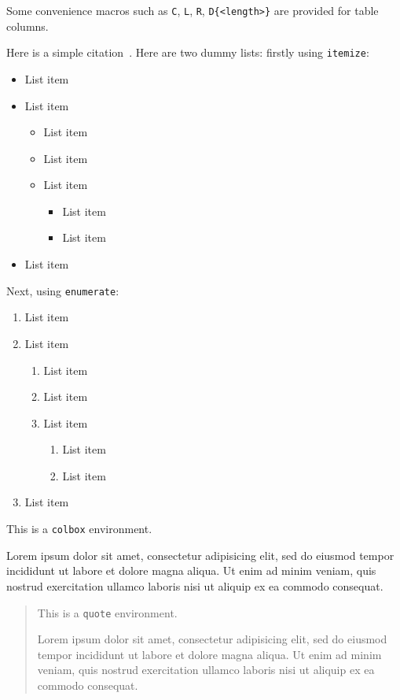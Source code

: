 \documentclass{penrose}
\begin{document}
Some convenience macros such as \texttt{C}, \texttt{L}, \texttt{R}, \texttt{D\{<length>\}} are provided for table columns.

Here is a simple citation~\cite{latexcompanion}. Here are two dummy lists: firstly using \texttt{itemize}:
\begin{itemize}
\item List item
\item List item
\begin{itemize}
\item List item
\item List item
\item List item
\begin{itemize}
\item List item
\item List item
\end{itemize}
\end{itemize}
\item List item
\end{itemize}
Next, using \texttt{enumerate}:
\begin{enumerate}
\item List item
\item List item
\begin{enumerate}
\item List item
\item List item
\item List item
\begin{enumerate}
\item List item
\item List item
\end{enumerate}
\end{enumerate}
\item List item
\end{enumerate}

\begin{colbox}
  This is a \texttt{colbox} environment.

  Lorem ipsum dolor sit amet, consectetur adipisicing elit, sed do eiusmod tempor incididunt ut labore et dolore magna aliqua. Ut enim ad minim veniam, quis nostrud exercitation ullamco laboris nisi ut aliquip ex ea commodo consequat.
\end{colbox}

\begin{quote}
  This is a \texttt{quote} environment.
  
  Lorem ipsum dolor sit amet, consectetur adipisicing elit, sed do eiusmod tempor incididunt ut labore et dolore magna aliqua. Ut enim ad minim veniam, quis nostrud exercitation ullamco laboris nisi ut aliquip ex ea commodo consequat.
\end{quote}
\end{document}
